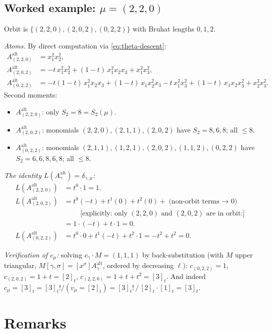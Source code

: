 \documentclass[11pt]{article}
\theoremstyle{definition}
\theoremstyle{remark}
\newcommand{\Aalt}{A^{\mathrm{alt}}}
\begin{document}
\subsection{Worked example: $\mu = (2,2,0)$}

Orbit is $\{(2,2,0), (2,0,2), (0,2,2)\}$ with Bruhat lengths $0,1,2$.

\emph{Atoms.} By direct computation via \eqref{eq:theta-descent}:
\begin{align*}
  \Aalt_{(2,2,0)} &= x_1^2 x_2^2,\\
  \Aalt_{(2,0,2)} &= -t\,x_1^2 x_2^2 + (1-t)\,x_1^2 x_2 x_3 + x_1^2 x_3^2,\\
  \Aalt_{(0,2,2)} &= -t(1-t)\,x_1^2 x_2 x_3 + (1-t)\,x_1 x_2^2 x_3 - t\,x_1^2 x_3^2 + (1-t)\,x_1 x_2 x_3^2 + x_2^2 x_3^2.
\end{align*}
Second moments:
\begin{itemize}\itemsep=0pt
\item $\Aalt_{(2,2,0)}$: only $S_2 = 8 = S_2(\mu)$.
\item $\Aalt_{(2,0,2)}$: monomials $(2,2,0), (2,1,1), (2,0,2)$ have $S_2 = 8, 6, 8$; all $\le 8$.
\item $\Aalt_{(0,2,2)}$: monomials $(2,1,1),(1,2,1),(2,0,2),(1,1,2),(0,2,2)$ have $S_2 = 6,6,8,6,8$; all $\le 8$.
\end{itemize}

\emph{The identity $L(\Aalt_\gamma) = \delta_{\gamma,\mu}$:}
\begin{align*}
  L(\Aalt_{(2,2,0)}) &= t^0 \cdot 1 = 1.\\
  L(\Aalt_{(2,0,2)}) &= t^0 (-t) + t^1 (0) + t^2 (0) + \text{(non-orbit terms $\to$ 0)} \\
                     &\quad \phantom{=} \text{[explicitly: only } (2,2,0)\text{ and } (2,0,2) \text{ are in orbit:]}\\
                     &= 1 \cdot (-t) + t \cdot 1 = 0.\\
  L(\Aalt_{(0,2,2)}) &= t^0 \cdot 0 + t^1 (-t) + t^2 \cdot 1 = -t^2 + t^2 = 0.
\end{align*}

\emph{Verification of $c_\mu$:} solving $c_\gamma\cdot M = (1,1,1)$ by back-substitution
(with $M$ upper triangular, $M[\gamma,\sigma] = [x^\sigma]\Aalt_\gamma$, ordered
by decreasing $\ell$):
$c_{(0,2,2)}=1$, $c_{(2,0,2)}=1+t=[2]_t$, $c_{(2,2,0)}=1+t+t^2=[3]_t$.
And indeed $c_\mu = [3]_t = [3]_t!/(v_\mu = [2]_t) = [3]_t!\,/\,[2]_t \cdot [1]_t = [3]_t$. \checkmark

\section{Remarks}
\end{document}
